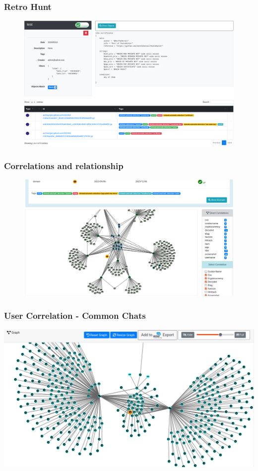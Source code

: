\documentclass{beamer}
\begin{document}
\begin{frame}
    \frametitle{Retro Hunt}
        \begin{figure}
            \includegraphics[scale=0.22]{screenshot/retro_hunt.png}
        \end{figure}
\end{frame}


\begin{frame}
    \frametitle{Correlations and relationship}
    \begin{figure}
        \includegraphics[scale=0.23, angle=0]{screenshot/ail-correlation.png}
    \end{figure}
\end{frame}

\begin{frame}
    \frametitle{User Correlation - Common Chats}
    \begin{center}
        \includegraphics[scale=0.26]{screenshot/chat_users_correlation.png}
    \end{center}
\end{frame}
\end{document}
